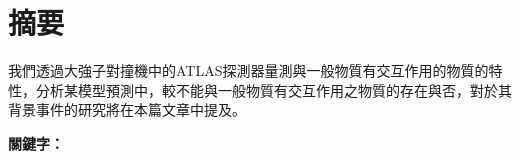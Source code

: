 \documentclass[class=NCU_thesis, crop=false]{standalone}
\begin{document}
\setlength{\parindent}{2em} %

\chapter{摘要}
	我們透過大強子對撞機中的ATLAS探測器量測與一般物質有交互作用的物質的特性，分析某模型預測中，較不能與一般物質有交互作用之物質的存在與否，對於其背景事件的研究將在本篇文章中提及。

\vspace{2em}

\noindent \textbf{關鍵字：} \keywordsZh{} %
\end{document}
